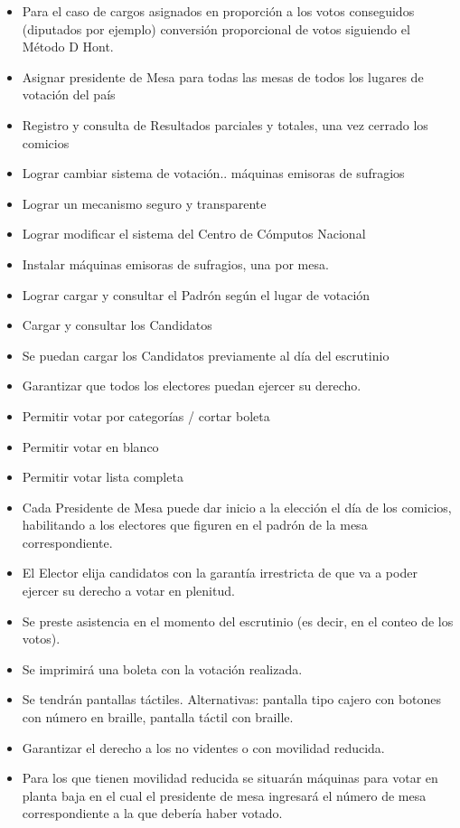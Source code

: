 \documentclass[spanish, 10pt,a4paper]{article}
\numberwithin{equation}{section} %
\begin{document}
\begin{itemize}
\item Para el caso de cargos asignados en proporción a los votos conseguidos (diputados por ejemplo) conversión proporcional de votos siguiendo el Método D Hont.
\item Asignar presidente de Mesa para todas las mesas de todos los lugares de votación del país
\item Registro y consulta de Resultados parciales y totales, una vez cerrado los comicios
\item Lograr cambiar sistema de votación.. máquinas emisoras de sufragios
\item Lograr un mecanismo seguro y transparente
\item Lograr modificar el sistema del Centro de Cómputos Nacional
\item Instalar máquinas emisoras de sufragios, una por mesa.
\item Lograr cargar y consultar el Padrón según el lugar de votación
\item Cargar y consultar los Candidatos
\item Se puedan cargar los Candidatos previamente al día del escrutinio
\item Garantizar que todos los electores puedan ejercer su derecho.
\item Permitir votar por categorías  / cortar boleta
\item Permitir votar en blanco
\item Permitir votar lista completa
\item Cada Presidente de Mesa puede dar inicio a la elección el día de los comicios, habilitando a los electores que figuren en el padrón de la mesa correspondiente.
\item El Elector elija candidatos con la garantía irrestricta de que va a poder ejercer su derecho a votar en plenitud.
\item Se preste asistencia en el momento del escrutinio (es decir, en el conteo de los votos).
\item Se imprimirá una boleta con la votación realizada.
\item Se tendrán pantallas táctiles. Alternativas: pantalla tipo cajero con botones con número en braille, pantalla táctil con braille.
\item Garantizar el derecho a los no videntes o con movilidad reducida. 
\item Para los que tienen movilidad reducida se situarán máquinas para votar en planta baja en el cual el presidente de mesa ingresará el número de mesa correspondiente a la que debería haber votado.

\end{itemize}
\end{document}
